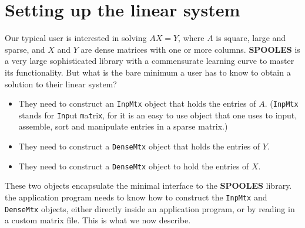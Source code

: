 \chapter{Setting up the linear system}
\label{section:setup-linear-system}
\par
Our typical user is interested in solving $A X = Y$,
where $A$ is square, large and sparse,
and $X$ and $Y$ are dense matrices with one or more columns.
{\bf SPOOLES} is a very large sophisticated library with 
a commensurate learning curve to master its functionality.
But what is the bare minimum a user has to know to obtain a
solution to their linear system?
\begin{itemize}
\item
They need to construct an {\tt InpMtx} object that holds
the entries of $A$. ({\tt InpMtx} stands for 
{\tt Inp}ut {\tt m}a{\tt t}ri{\tt x},
for it is an easy to use object that one uses to input, 
assemble, sort and manipulate entries in a sparse matrix.)
\item
They need to construct a {\tt DenseMtx} object that holds
the entries of $Y$.
\item
They need to construct a {\tt DenseMtx} object to hold
the entries of $X$.
\end{itemize}
These two objects encapsulate the minimal interface to the 
{\bf SPOOLES} library.
the application program needs to know how to construct
the {\tt InpMtx} and {\tt DenseMtx} objects, either directly inside
an application program, or by reading in a custom matrix file.
This is what we now describe.
\par
